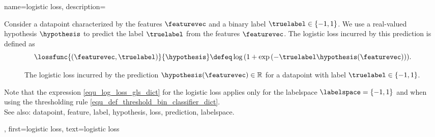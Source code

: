 {name={logistic loss}, 
	description={Consider 
		a \gls{datapoint} characterized by the \glspl{feature} $\featurevec$ and a binary \gls{label} $\truelabel \in \{-1,1\}$. 
		We use a real-valued \gls{hypothesis} $\hypothesis$ to predict the \gls{label} $\truelabel$ 
		from the \glspl{feature} $\featurevec$. The logistic \gls{loss} incurred by this \gls{prediction} is 
		defined as 
	\begin{equation} 
		\label{equ_log_loss_gls_dict}
		\lossfunc{(\featurevec,\truelabel)}{\hypothesis} \defeq  \log\, ( 1 + \exp\,(- \truelabel \hypothesis(\featurevec))).
	\end{equation}
	\begin{figure}[H]
	\begin{center}
		\caption{The logistic \gls{loss} incurred by the \gls{prediction} $\hypothesis(\featurevec) \in \mathbb{R}$ 
			for a \gls{datapoint} with \gls{label} $\truelabel \in \{-1,1\}$.}
		\label{fig_logloss_dict}
	\end{center}
	\end{figure}
	Note that the expression \eqref{equ_log_loss_gls_dict} 
	for the logistic \gls{loss} applies only for the \gls{labelspace} $\labelspace = \{ -1,1\}$ and when using 
	the thresholding rule \eqref{equ_def_threshold_bin_classifier_dict}. 
		\\
		See also: \gls{datapoint}, \gls{feature}, \gls{label}, \gls{hypothesis}, \gls{loss}, \gls{prediction}, \gls{labelspace}.},
	first={logistic loss},
	text={logistic loss}
}
	
